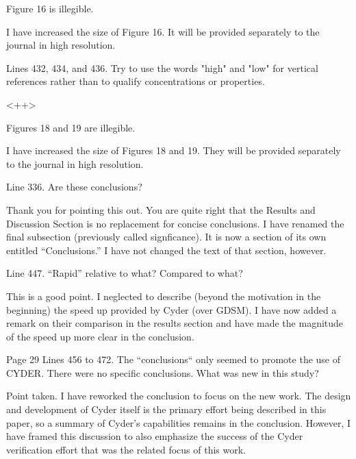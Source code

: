 \documentclass[answers,12pt]{exam}
\begin{document}
\begin{questions}
\question Figure 16 is illegible.
\begin{solution}
I have increased the size of Figure 16.
        It will be provided separately to the journal in high resolution. 
\end{solution}

 

\question Lines 432, 434, and 436. Try to use the words "high" and "low" for vertical references rather than to qualify concentrations or properties.
\begin{solution}
<++>
\end{solution}

 

\question Figures 18 and 19 are illegible.
\begin{solution}
I have increased the size of Figures 18 and 19.
        They will be provided separately to the journal in high resolution. 
\end{solution}

 

\question Line 336. Are these conclusions?
\begin{solution}
Thank you for pointing this out. You are quite right that the Results and 
        Discussion Section is no replacement for concise conclusions. I have 
        renamed the final subsection (previously called signficance). It is now 
        a section of its own entitled ``Conclusions.'' I have not changed the 
        text of that section, however. 
\end{solution}

 

\question Line 447. ``Rapid'' relative to what? Compared to what?
\begin{solution}
        This is a good point. I neglected to describe (beyond the motivation in 
        the beginning) the speed up provided by Cyder (over GDSM). I have now 
        added a remark on their comparison in the results section and have made 
        the magnitude of the speed up more clear in the conclusion.
\end{solution}

 

\question Page 29 Lines 456 to 472. The ``conclusions`` only seemed to promote the use of CYDER. There were no specific conclusions. What was new in this study? 
\begin{solution}
Point taken. I have reworked the conclusion to focus on the new work. The 
        design and development of Cyder itself is the primary effort being 
        described in this paper, so a summary of Cyder's capabilities remains 
        in the conclusion. However, I have framed this discussion to also 
        emphasize the success of the Cyder verification effort that was the related 
        focus of this work.
\end{solution}



\end{questions}
\end{document}
